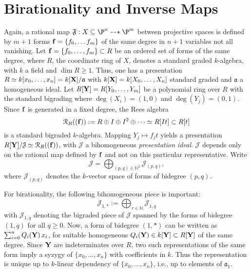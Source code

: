 \documentclass[11pt]{amsart}
\numberwithin{equation}{theorem}
\def\ff{{\bf f}}
\def\XX{{\bf X}}
\def\YY{{\bf Y}}
\renewcommand{\:}{\colon}
\DeclareMathOperator{\edim}{edim}
\theoremstyle{theorem}
\begin{document}
\section{Birationality and Inverse Maps}
Again, a rational map $\mathfrak{F}:X\subseteq \P^n\dasharrow \P^m$ between projective spaces is defined by $m+1$ forms $\ff=\{f_0,\ldots f_m\}$ of the same degree in $n+1$ variables not all vanishing.  Let $\ff=\{f_0,\ldots,f_m\}\subset R$ be an ordered set of forms of the same degree,
where $R$, the coordinate ring of $X$,  denotes a standard graded $k$-algebra, with $k$ a field and $\dim R\geq 1$.
Thus, one has a presentation $R\simeq k[x_0,\ldots, x_n]=k[\XX]/\mathfrak{a}$ with $k[\XX]=k[X_0,\ldots, X_n]$
standard graded and $\mathfrak{a}$ a homogeneous ideal.
Let $R[\YY]=R[Y_0,\ldots,Y_m]$ be a polynomial ring over $R$ with the standard bigrading
where $\deg(X_i)=(1,0)$ and $\deg(Y_j)=(0,1)$.
Since $\ff$ is generated in a fixed degree, the Rees algebra
$${\mathcal R}_R((\ff)):=R\oplus I\oplus I^2\oplus \cdots \simeq R[It]\subset R[t]$$
is a standard bigraded $k$-algebra. Mapping $Y_j\mapsto f_jt$ yields
a presentation $R[\YY]/\mathcal{J}\simeq {\mathcal R}_R((\ff))$, with $\mathcal{J}$ a bihomogeneous {\em presentation
ideal}.
$\mathcal{J}$ depends only on the rational map defined by $\ff$
and not on this particular representative.
Write
$${\mathcal J}=\bigoplus_{(p,q)\in \mathbb{N}^2} {\mathcal J}_{(p,q)},$$
where ${\mathcal J}_{(p,q)}$ denotes the $k$-vector space of forms of bidegree $(p,q)$.



For birationality, the following bihomogeneous piece is  important:
$${\mathcal J}_{1,*}:=\bigoplus_{r\in\mathbb{N}} {\mathcal J}_{1,q}$$
with ${\mathcal J}_{1,q}$ denoting the bigraded piece of ${\mathcal J}$ spanned by the forms of bidegree
 $(1,q)$ for all $q\geq 0$. Now, a form of bidegree $(1,*)$ can be written as $\sum_{i=0}^n Q_i(\YY)\,x_i$, for suitable homogeneous $Q_i(\YY)\in k[\YY]\subset R[\YY]$
of the same degree.
Since $\YY$ are indeterminates over $R$, two such representations of the same form imply a syzygy of $\{x_0,\ldots,x_n\}$
with coefficients in $k$. Thus the representation is unique  up to $k$-linear dependency
of $\{x_0,\ldots,x_n\}$,  i.e., up to elements of ${\mathfrak a}_1$.

\end{document}
